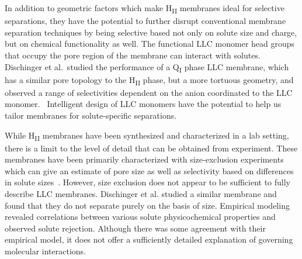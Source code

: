 \documentclass[journal=jpcbfk,manuscript=article]{achemso}
\begin{document}
  In addition to geometric factors which make H\textsubscript{II} membranes
  ideal for selective separations, they have the potential to further disrupt
  conventional membrane separation techniques by being selective based not
  only on solute size and charge, but on chemical functionality as well. 
  The functional LLC monomer head groups that occupy the pore region of the
  membrane can interact with solutes. Dischinger et al.~studied the 
  performance of a Q\textsubscript{I} phase LLC membrane, which has a 
  similar pore topology to the H\textsubscript{II} phase, but a more 
  tortuous geometry, and observed a range of selectivities dependent on the
  anion coordinated to the LLC monomer.~\cite{dischinger_effect_2017} Intelligent 
  design of LLC monomers have the potential to help us tailor membranes for 
  solute-specific separations.

  While H\textsubscript{II} membranes have been synthesized and characterized
  in a lab setting, there is a limit to the level of detail that can be obtained 
  from experiment. These membranes have been primarily characterized with 
  size-exclusion experiments which can give an estimate of pore size as well as
  selectivity based on differences in solute sizes~\cite{zhou_supported_2005}. 
  However, size exclusion does not appear to be sufficient to fully describe LLC
  membranes. Dischinger et al. studied a similar membrane and found that they do
  not separate purely on the basis of size. Empirical modeling revealed correlations
  between various solute physicochemical properties and observed solute rejection. 
  Although there was some agreement with their empirical model, it does not
  offer a sufficiently detailed explanation of governing molecular interactions.
  ~\cite{dischinger_effect_2017}
 
\end{document}
